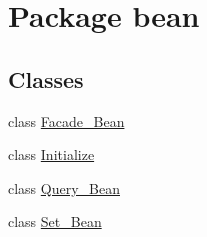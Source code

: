 \hypertarget{namespacebean}{}\section{Package bean}
\label{namespacebean}
\subsection*{Classes}
\begin{DoxyCompactItemize}
\item 
class \mbox{\hyperlink{classbean_1_1Facade__Bean}{Facade\+\_\+\+Bean}}
\item 
class \mbox{\hyperlink{classbean_1_1Initialize}{Initialize}}
\item 
class \mbox{\hyperlink{classbean_1_1Query__Bean}{Query\+\_\+\+Bean}}
\item 
class \mbox{\hyperlink{classbean_1_1Set__Bean}{Set\+\_\+\+Bean}}
\end{DoxyCompactItemize}
